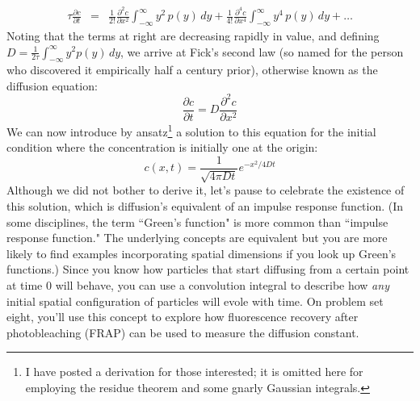 \documentclass{article}
\begin{document}
\begin{eqnarray*}
\tau \frac{\partial c}{\partial t} & = & \frac{1}{2!} \frac{\partial^2 c}{\partial x^2} \int_{-\infty}^{\infty} y^2 \, p(y) \, dy + \frac{1}{4!} \frac{\partial^4 c}{\partial x^4} \int_{-\infty}^{\infty} y^4 \, p(y) \, dy + \ldots
\end{eqnarray*}
Noting that the terms at right are decreasing rapidly in value, and defining $D=\frac{1}{2\tau} \int_{-\infty}^{\infty} y^2 p(y) \, dy$, we arrive at Fick's second law (so named for the person who discovered it empirically half a century prior), otherwise known as the diffusion equation:
\[ \frac{\partial c}{\partial t} = D \frac{\partial^2 c}{\partial x^2} \]
We can now introduce by ansatz\footnote{I have posted a derivation for those interested; it is omitted here for employing the residue theorem and some gnarly Gaussian integrals.} a solution to this equation for the initial condition where the concentration is initially one at the origin:
\[ c(x,t) = \frac{1}{\sqrt{4 \pi D t}} e^{-x^2/4Dt} \]
Although we did not bother to derive it, let's pause to celebrate the existence of this solution, which is diffusion's equivalent of an impulse response function. (In some disciplines, the term ``Green's function" is more common than ``impulse response function." The underlying concepts are equivalent but you are more likely to find examples incorporating spatial dimensions if you look up Green's functions.) Since you know how particles that start diffusing from a certain point at time $0$ will behave, you can use a convolution integral to describe how \textit{any} initial spatial configuration of particles will evole with time. On problem set eight, you'll use this concept to explore how fluorescence recovery after photobleaching (FRAP) can be used to measure the diffusion constant.\\
\end{document}
